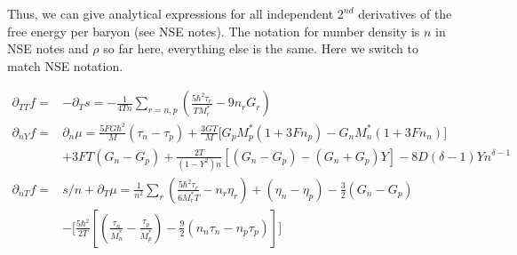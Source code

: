 \documentclass[preprint,prc,preprintnumbers,superscriptaddress,amsmath,amssymb,floatfix]{revtex4-1}
\begin{document}
Thus, we can give analytical expressions for all independent $2^{nd}$ derivatives of the free energy per baryon (see NSE notes). The 
notation for number density is $n$ in NSE notes and $\rho$ so far here, everything else is the same. Here we switch to match NSE notation.

\begin{mdframed}
 \begin{equation}
  \begin{split}
   \partial_{TT}f=&-\partial_Ts=-\frac{1}{4Tn}\sum_{r={n,p}}(\frac{5\hbar^2\tau_r}{TM_r^{*}}-9n_r G_r)\\
   \partial_{nY}f=&\partial_n\mu=\frac{5 FG\hbar^2}{M}(\tau_n-\tau_p)+\frac{3GT}{M}\Big[G_p M^{*}_p (1+3Fn_p)-G_n M^{*}_n(1+3Fn_n)\Big]\\
  &+3FT(G_n-G_p)+\frac{2T}{(1-Y^2)n}[(G_n-G_p)-(G_n+G_p)Y]-8D(\delta-1)Yn^{\delta-1}\\
  \partial_{nT}f=& s/n+\partial_T\mu=\frac{1}{n^2}\sum_r(\frac{5\hbar^2 \tau_r}{6 M_r^{*}T}-n_r\eta_r)+(\eta_n-\eta_p)-\frac{3}{2}(G_n-G_p)\\
  &-\Big[\frac{5\hbar^2}{2T}[(\frac{\tau_n}{M_n^{*}}-\frac{\tau_p}{M_p^{*}})-\frac{9}{2}(n_n \tau_n-n_p \tau_p)]\Big]
  \end{split}
 \end{equation}
\end{mdframed}
\end{document}
